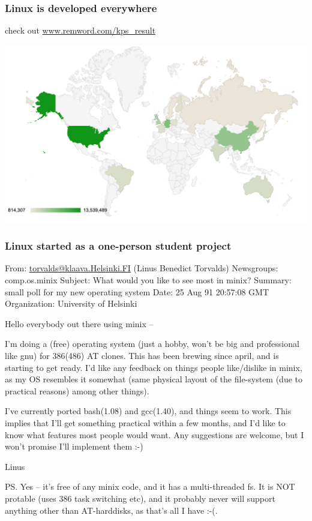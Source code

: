 \documentclass[17pt]{beamer}
\begin{document}
\begin{frame}
\frametitle{Linux is developed everywhere}

check out \url{www.remword.com/kps_result}
\begin{center}
  \includegraphics[width=\textwidth]{linux_world_map.png}
\end{center}

\end{frame}


\begin{frame}
\frametitle{Linux started as a one-person student project}
  {\tiny
    From: \url{torvalds@klaava.Helsinki.FI} (Linus Benedict Torvalds)
    Newsgroups: comp.os.minix
    Subject: What would you like to see most in minix?
    Summary: small poll for my new operating system
    Date: 25 Aug 91 20:57:08 GMT
    Organization: University of Helsinki

    Hello everybody out there using minix –

    I’m doing a (free) operating system (just a hobby, won’t be big and
    professional like gnu) for 386(486) AT clones. This has been brewing
    since april, and is starting to get ready. I’d like any feedback on
    things people like/dislike in minix, as my OS resembles it somewhat
    (same physical layout of the file-system (due to practical reasons)
    among other things).

    I’ve currently ported bash(1.08) and gcc(1.40), and things seem to work.
    This implies that I’ll get something practical within a few months, and
    I’d like to know what features most people would want. Any suggestions
    are welcome, but I won’t promise I’ll implement them :-)

    Linus 

    PS. Yes – it’s free of any minix code, and it has a multi-threaded fs.
    It is NOT protable (uses 386 task switching etc), and it probably never
    will support anything other than AT-harddisks, as that’s all I have :-(.

}
\end{frame}
\end{document}
